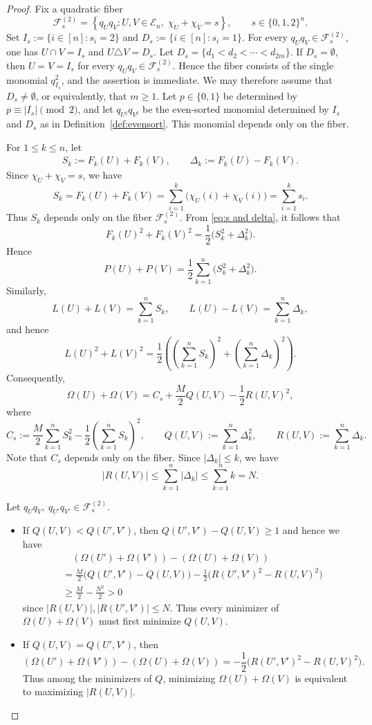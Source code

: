 \documentclass[11pt]{amsart}
\theoremstyle{definition}
\numberwithin{equation}{section}
\begin{document}
\begin{proof}
Fix a quadratic fiber
\[
 \mathcal{F}^{(2)}_s
=
 \left\{
q_Uq_V : U,V\in\mathcal{E}_n,\;
 \chi_U+\chi_V=s
 \right\},
 \qquad s\in\{0,1,2\}^n.
\]
Set $I_s:=\{i\in[n]:s_i=2\}$ and $D_s:=\{i\in[n]:s_i=1\}$. For every $q_Uq_V\in\mathcal{F}^{(2)}_s$, one has $U\cap V=I_s$ and $U\triangle V=D_s$. 
Let $D_s=\{d_1<d_2<\cdots<d_{2m}\}$.
If $D_s=\emptyset$, then $U=V=I_s$ for every $q_Uq_V\in\mathcal F_s^{(2)}$. Hence the fiber consists of the single monomial $q_{I_s}^2$, and the assertion is immediate. We may therefore assume that $D_s\ne\emptyset$, or equivalently, that $m\ge 1$.
Let $p\in\{0,1\}$ be determined by $p\equiv |I_s|\pmod 2$, and let $q_{U^\sharp}q_{V^\sharp}$ be the even-sorted monomial determined by $I_s$ and $D_s$ as in Definition~\ref{def:evensort}. 
This monomial depends only on the fiber.


For $1\le k\le n$, let
\begin{align}   \label{eq:s and delta}
S_k:=F_k(U)+F_k(V),
\qquad
\Delta_k:=F_k(U)-F_k(V).
\end{align}
Since $\chi_U+\chi_V=s$, we have
\[
S_k
=
F_k(U)+F_k(V)
=
\sum_{i=1}^k\bigl(\chi_U(i)+\chi_V(i)\bigr)
=
\sum_{i=1}^k s_i.
\]
Thus $S_k$ depends only on the fiber
$\mathcal F_s^{(2)}$.
From \eqref{eq:s and delta},
it follows that
\[
F_k(U)^2+F_k(V)^2
=
\frac12\bigl(S_k^2+\Delta_k^2\bigr).
\]
Hence
\[
P(U)+P(V)
=
\frac12\sum_{k=1}^n
\bigl(S_k^2+\Delta_k^2\bigr).
\]
Similarly,
\[
L(U)+L(V)
=
\sum_{k=1}^n S_k,
\qquad
L(U)-L(V)
=
\sum_{k=1}^n \Delta_k,
\]
and hence
\[
L(U)^2+L(V)^2
=
\frac12\left(
\left(\sum_{k=1}^n S_k\right)^2
+
\left(\sum_{k=1}^n\Delta_k\right)^2
\right).
\]
Consequently,
\[
 \Omega(U)+\Omega(V)
= C_s+\frac{M}{2}Q(U,V)-\frac12R(U,V)^2,
\]
where
\[
 C_s:=\frac M2\sum_{k=1}^nS_k^2
 -\frac12\left(\sum_{k=1}^nS_k\right)^2,
\qquad
Q(U,V):=\sum_{k=1}^n\Delta_k^2,
 \qquad
R(U,V):=\sum_{k=1}^n\Delta_k.
\]
Note that $C_s$ depends only on the fiber.
Since $|\Delta_k|\le k$, we have
\[
 |R(U,V)|\le\sum_{k=1}^n|\Delta_k|
 \le\sum_{k=1}^n k=N.
\]

Let $ q_Uq_V,\ q_{U'}q_{V'}\in\mathcal{F}^{(2)}_s$.
\begin{itemize}
    \item 
If $Q(U,V)<Q(U',V')$, then 
$Q(U',V') - Q(U,V) \ge 1$
and hence
we have
\begin{align*}
& \quad ( \Omega(U')+\Omega(V'))-( \Omega(U)+\Omega(V))\\
& =
 \frac{M}{2}\bigl(Q(U',V')-Q(U,V)\bigr)
-
 \frac12\bigl(R(U',V')^2-R(U,V)^2\bigr)\\
& \ge
 \frac{M}{2}-\frac{N^2}{2}>0
\end{align*}
since $|R(U,V)|, |R(U',V')| \le N$.
Thus every minimizer of \(\Omega(U)+\Omega(V)\) must first minimize
\(Q(U,V)\).
\item
If $Q(U,V)=Q(U',V')$, then 
\[
( \Omega(U')+\Omega(V'))-( \Omega(U)+\Omega(V))
=-
 \frac12\bigl(R(U',V')^2-R(U,V)^2\bigr).
\]
Thus among the minimizers of \(Q\), minimizing
\(\Omega(U)+\Omega(V)\) is equivalent to maximizing
$|R(U,V)|$.
\end{itemize}


\end{proof}
\end{document}
